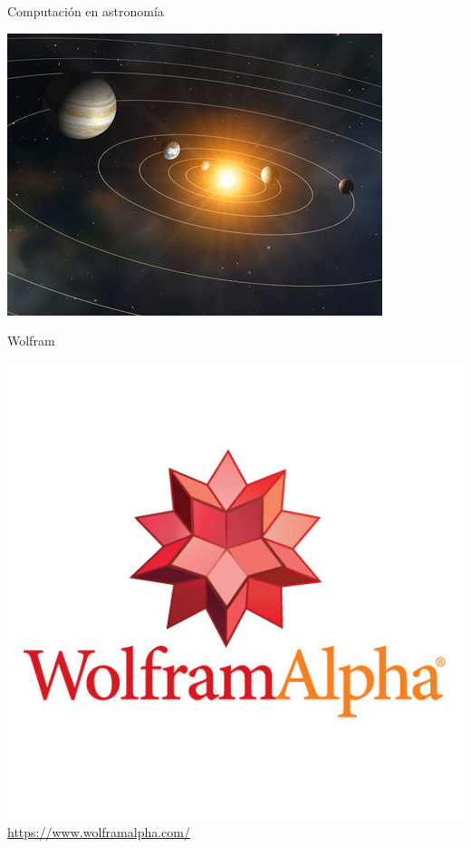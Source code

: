 \documentclass[10pt,xcolor={dvipsnames}]{beamer}
\begin{document}
\begin{frame}{Computación en astronomía}
\begin{center}
\includegraphics[scale=0.6]{Figures/sistemasolar}
\end{center}
\end{frame}

\begin{frame}{Wolfram}
\begin{center}
\includegraphics[scale=0.3]{Figures/Wolfram} \pause \\ 
\url{https://www.wolframalpha.com/}
\end{center}
\end{frame}
\end{document}

